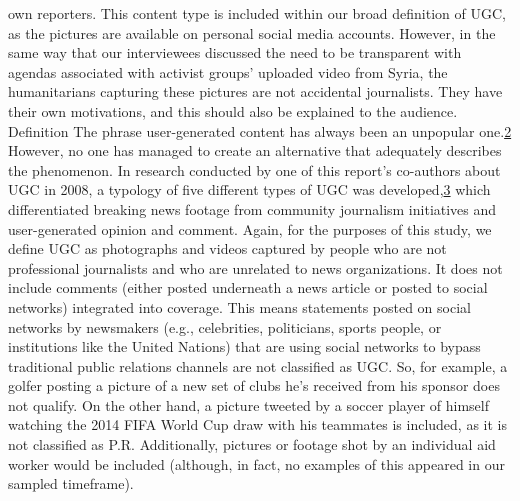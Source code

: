 \documentclass[symmetric, notoc, nobib]{towcenter-book}
\begin{document}
own reporters. This content type is included within our broad definition of
UGC, as the pictures are available on personal social media accounts. However,
in the same way that our interviewees discussed the need to be transparent
with agendas associated with activist groups' uploaded video from
Syria, the humanitarians capturing these pictures are not accidental journalists.
They have their own motivations, and this should also be explained
to the audience.
Definition
The phrase user-generated content has always been an unpopular one.{\href{#endnotes}{2}}
However, no one has managed to create an alternative that adequately
describes the phenomenon. In research conducted by one of this report's
co-authors about UGC in 2008, a typology of five different types of UGC
was developed,{\href{#endnotes}{3}} which differentiated breaking news footage from community
journalism initiatives and user-generated opinion and comment.
Again, for the purposes of this study, we define UGC as photographs and
videos captured by people who are not professional journalists and who
are unrelated to news organizations. It does not include comments (either
posted underneath a news article or posted to social networks) integrated
into coverage.
This means statements posted on social networks by newsmakers (e.g.,
celebrities, politicians, sports people, or institutions like the United Nations)
that are using social networks to bypass traditional public relations channels
are not classified as UGC. So, for example, a golfer posting a picture
of a new set of clubs he's received from his sponsor does not qualify. On
the other hand, a picture tweeted by a soccer player of himself watching
the 2014 FIFA World Cup draw with his teammates is included, as it is not
classified as P.R. Additionally, pictures or footage shot by an individual aid
worker would be included (although, in fact, no examples of this appeared
in our sampled timeframe).
\end{document}
